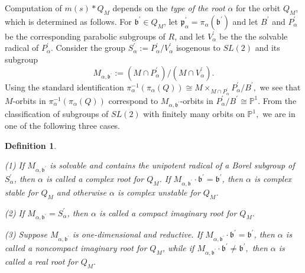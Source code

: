 \documentclass[12pt]{amsart}
\numberwithin{equation}{section}
\newtheorem{dfn}[thm]{Definition}
\newcommand{\fp}{\mbox{${\mathfrak p}$}}
\newcommand{\fb}{\mbox{${\mathfrak b}$}}
\newcommand{\PR}{\mbox{${\mathbb P}$}}
\begin{document}

Computation of $m(s)*Q_{M}$ depends on the \emph{type of the root} $\alpha$ for the orbit $Q_{M}$, which is determined as follows.  For $\fb^{\prime}\in Q_M$, let $\fp_{\alpha}^{\prime} = \pi_{\alpha}(\fb^{\prime})$ and let $B^{\prime}$ and $P_{\alpha}^{\prime}$ be the corresponding parabolic subgroups of $R$, and let $V_{\alpha}^{\prime}$ be the the solvable radical of $P_{\alpha}^{\prime}$.  Consider the group 
$S_{\alpha}^{\prime}:= P_{\alpha}^{\prime}/V_{\alpha}^{\prime}$ isogenous to $SL(2)$ and its subgroup
\begin{equation}\label{eq:Malpha}
M_{\alpha, \fb^{\prime}}:= (M \cap P_{\alpha}^{\prime})/(M\cap V_{\alpha}^{\prime}).
\end{equation}
Using the standard identification $\pi_{\alpha}^{-1}(\pi_{\alpha}(Q)) \cong M\times_{M\cap P_{\alpha}^{\prime}} P_{\alpha}^{\prime}/B^{\prime},$ we see that $M$-orbits in
 $\pi_{\alpha}^{-1}(\pi_{\alpha}(Q))$ correspond to $M_{\alpha, \fb^{\prime}}$-orbits in 
$P^{\prime}_{\alpha}/B^{\prime}\cong {\PR}^1.$  From the classification of subgroups of $SL(2)$ with finitely many orbits on ${\PR}^1,$ we are in one of the following three cases.

\begin{dfn}\label{d:roottype}
\par\noindent (1) If $M_{\alpha, \fb^{\prime}}$ is solvable and contains the unipotent radical of a Borel subgroup of $S_{\alpha}^{\prime}$, then $\alpha$ is called a complex root for $Q_M$.  If $M_{\alpha, \fb^{\prime}}\cdot \fb^{\prime}=\fb^{\prime}$, then $\alpha$ is complex stable for $Q_M$ and otherwise $\alpha$ is complex unstable for $Q_M$.
\par\noindent (2) If $M_{\alpha, \fb^{\prime}}=S_{\alpha}^{\prime}$, then $\alpha$ is called a compact imaginary root for $Q_M.$
\par\noindent (3) Suppose $M_{\alpha, \fb^{\prime}}$ is one-dimensional and reductive.
If $M_{\alpha,\fb^{\prime}}\cdot \fb^{\prime}=\fb^{\prime}$, then $\alpha$ is called a noncompact imaginary root for $Q_M$, while if $M_{\alpha,\fb^{\prime}}\cdot \fb^{\prime}\not=\fb^{\prime},$ then $\alpha$ is called a real root for $Q_M.$
\end{dfn}
\end{document}
